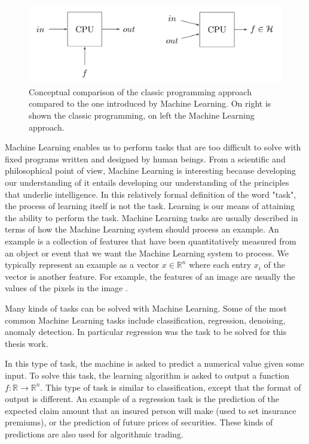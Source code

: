 \begin{figure}
    \centering
    \includegraphics[width=14cm]{img/ml.png}
    \caption{Conceptual comparison of the classic programming approach compared to the one introduced by Machine Learning. On right is shown the classic programming, on left the Machine Learning approach.}\label{ML_programming}
\end{figure}

Machine Learning enables us to perform tasks that are too difficult to solve with fixed programs written and designed by human beings. From a scientific and philosophical point of view, Machine Learning is interesting because developing our understanding of it entails developing our understanding of the principles that underlie intelligence. In this relatively formal definition of the word "task", the process of learning itself is not the task. Learning is our means of attaining the ability to perform the task. Machine Learning tasks are usually described in terms of how the Machine Learning system should process an example. An example is a collection of features that have been quantitatively measured from an object or event that we want the Machine Learning system to process. We typically represent an example as a vector $x\in \mathbb{R}  ^n$ where each entry $x_i$ of the vector is another feature. For example, the features of an image are usually the values of the pixels in the image \cite{deeplearningbook}.

Many kinds of tasks can be solved with Machine Learning. Some of the most common Machine Learning tasks include classification, regression, denoising, anomaly detection. In particular regression was the task to be solved for this thesis work.

In this type of task, the machine is asked to predict a numerical value given some input. To solve this task, the learning algorithm is asked to output a function $f: \mathbb{R} \to \mathbb{R}^n$. This type of task is similar to classification, except that the format of output is different. An example of a regression task is the prediction of the expected claim amount that an insured person will make (used to set insurance premiums), or the prediction of future prices of securities. These kinds of predictions are also used for algorithmic trading.

